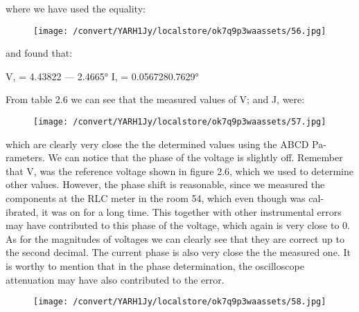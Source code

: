 \documentclass[12pt]{report}
\begin{document}
\vspace{10pt}

    where we have used the equality: 

\vspace{10pt}

\begin{figure}[h]

\texttt{[image: /convert/YARH1Jy/localstore/ok7q9p3waassets/56.jpg]}

\centering

\end{figure}

    and found that: 

\vspace{10pt}

    V, = 4.43822 — 2.4665° I, = 0.0567280.7629° 

\vspace{10pt}

    From table 2.6 we can see that the measured values of V; and J, were: 

\vspace{10pt}

\begin{figure}[h]

\texttt{[image: /convert/YARH1Jy/localstore/ok7q9p3waassets/57.jpg]}

\centering

\end{figure}

    which are clearly very close the the determined values using the ABCD Pa-  rameters.   We can notice that the phase of the voltage is slightly off. Remember that  V, was the reference voltage shown in figure 2.6, which we used to determine  other values. However, the phase shift is reasonable, since we measured the  components at the RLC meter in the room 54, which even though was cal-  ibrated, it was on for a long time. This together with other instrumental  errors may have contributed to this phase of the voltage, which again is very  close to 0. As for the magnitudes of voltages we can clearly see that they are  correct up to the second decimal. The current phase is also very close the  the measured one. It is worthy to mention that in the phase determination,  the oscilloscope attenuation may have also contributed to the error. 

\vspace{10pt}

\begin{figure}[h]

\texttt{[image: /convert/YARH1Jy/localstore/ok7q9p3waassets/58.jpg]}

\centering

\end{figure}
\end{document}

